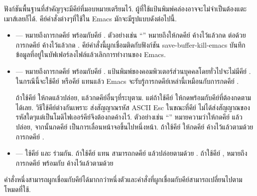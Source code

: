 \begin{thwbr}
ฟังก์ชันพื้นฐานที่สำคัญๆจะมีคีย์ที่มอบหมายเตรียมไว้. ผู้ที่ใช้แป้นพิมพ์คล่องอาจจะไม่จำเป็นต้องแตะเมาส์เลยก็ได้. คีย์คำสั่งต่างๆที่ใช้ใน Emacs มักจะมีรูปแบบดังต่อไปนี้.


\begin{itemize}
\item {} --- หมายถึงการกดคีย์  พร้อมกับคีย์ . ตัวอย่างเช่น ``'' หมายถึงให้กดคีย์  ค้างไว้แล้วกด  ต่อด้วยการกดคีย์  ค้างไว้แล้วกด . คีย์คำสั่งนี้ผูกเชื่อมติดกับฟังก์ชัน save-buffer-kill-emacs บันทึกข้อมูลที่อยู่ในบัฟเฟอร์ลงไฟล์แล้วเลิกการทำงานของ Emacs.
\item {} --- หมายถึงการกดคีย์  พร้อมกับคีย์ . แป้นพิมพ์ของคอมพิวเตอร์ส่วนบุคคลโดยทั่วไปจะไม่มีคีย์ . ในกรณีนี้จะใช้คีย์  หรือคีย์  แทนแล้ว Emacs จะรับรู้การกดคีย์เหล่านี้เหมือนกับการกดคีย์ . 

ถ้าใช้คีย์  ให้กดแล้วปล่อย, แล้วกดคีย์อื่นๆที่ระบุตาม. แต่ถ้าใช้คีย์  ให้กดพร้อมกับคีย์ที่ต้องกดตามได้เลย. วิธีใช้คีย์ต่างกันเพราะ  ส่งสัญญาณรหัส ASCII Esc ในขณะที่คีย์  ไม่ได้ส่งสัญญาณของรหัสใดๆแต่เป็นโมดิไฟเออร์คีย์จึงต้องกดค้างไว้. ตัวอย่างเช่น ``'' หมายความว่าให้กดคีย์  แล้วปล่อย, จากนั้นกดคีย์   เป็นการเลื่อนหน้าจอขึ้นไปหนึ่งหน้า. ถ้าใช้คีย์  ให้กดคีย์  ค้างไว้แล้วตามด้วยการกดคีย์ .
\item {} --- ใช้คีย์  และ  ร่วมกัน. ถ้าใช้คีย์  แทน  สามารถกดคีย์  แล้วปล่อยตามด้วย . ถ้าใช้คีย์ ,  หมายถึงการกดคีย์  พร้อมกับ  ค้างไว้แล้วตามด้วย 

\end{itemize}
คำสั่งหนึ่งสามารถผูกเชื่อมกับคีย์ได้มากกว่าหนึ่งตัวและคำสั่งที่ผูกเชื่อมกับคีย์สามารถเปลี่ยนไปตามโหมดที่ใช้.



\end{thwbr}
